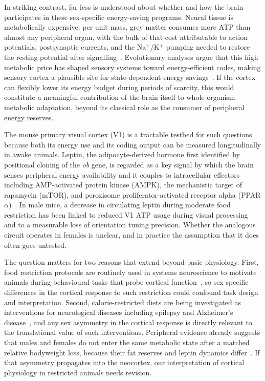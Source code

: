 \documentclass[11pt]{article}
\begin{document}
In striking contrast, far less is understood about whether and how the brain participates in these sex-specific energy-saving programs. Neural tissue is metabolically expensive: per unit mass, grey matter consumes more ATP than almost any peripheral organ, with the bulk of that cost attributable to action potentials, postsynaptic currents, and the Na$^+$/K$^+$ pumping needed to restore the resting potential after signalling~\citep{attwell2001energy, niven2008energy}. Evolutionary analyses argue that this high metabolic price has shaped sensory systems toward energy-efficient codes, making sensory cortex a plausible site for state-dependent energy savings~\citep{niven2008energy}. If the cortex can flexibly lower its energy budget during periods of scarcity, this would constitute a meaningful contribution of the brain itself to whole-organism metabolic adaptation, beyond its classical role as the consumer of peripheral energy reserves.

The mouse primary visual cortex (V1) is a tractable testbed for such questions because both its energy use and its coding output can be measured longitudinally in awake animals. Leptin, the adipocyte-derived hormone first identified by positional cloning of the \textit{ob} gene, is regarded as a key signal by which the brain senses peripheral energy availability and it couples to intracellular effectors including AMP-activated protein kinase (AMPK), the mechanistic target of rapamycin (mTOR), and peroxisome proliferator-activated receptor alpha (PPAR$\alpha$)~\citep{zhang1994positional, steinberg2023ampk, laplante2013mtorc1, yao2022ampk, ward2016ampk, su2019hsf1, lopezdominguez2016omega3}. In male mice, a decrease in circulating leptin during moderate food restriction has been linked to reduced V1 ATP usage during visual processing and to a measurable loss of orientation tuning precision. Whether the analogous circuit operates in females is unclear, and in practice the assumption that it does often goes untested.

The question matters for two reasons that extend beyond basic physiology. First, food restriction protocols are routinely used in systems neuroscience to motivate animals during behavioural tasks that probe cortical function~\citep{scott2023cisplatin, heinz2021foraging}, so sex-specific differences in the cortical response to such restriction could confound task design and interpretation. Second, calorie-restricted diets are being investigated as interventions for neurological diseases including epilepsy and Alzheimer's disease~\citep{greenfield2025lifespan}, and any sex asymmetry in the cortical response is directly relevant to the translational value of such interventions. Peripheral evidence already suggests that males and females do not enter the same metabolic state after a matched relative bodyweight loss, because their fat reserves and leptin dynamics differ~\citep{kwon2014gpr30, nestor2014crosstalk, elsehrawy2025eralpha}. If that asymmetry propagates into the neocortex, our interpretation of cortical physiology in restricted animals needs revision.
\end{document}
